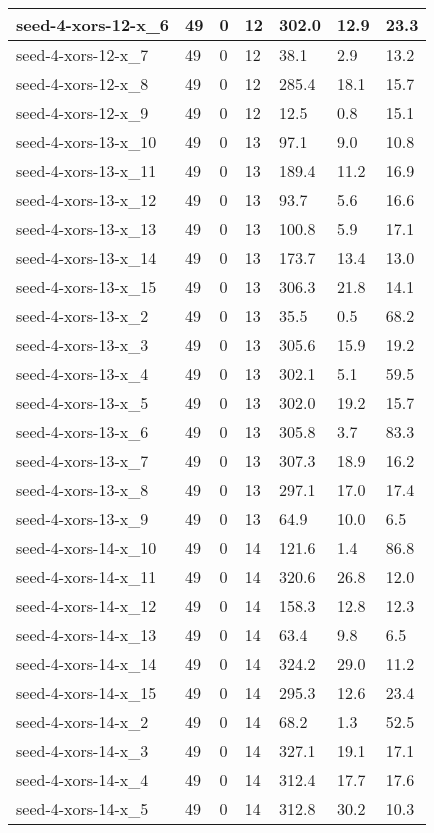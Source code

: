 \begin{scriptsize}
\begin{longtable}{|p{5cm}|l|l|l|l|l|l|}
seed-4-xors-12-x\_6&49&0&12&302.0&12.9&23.3 \\ \hline 
seed-4-xors-12-x\_7&49&0&12&38.1&2.9&13.2 \\ \hline 
seed-4-xors-12-x\_8&49&0&12&285.4&18.1&15.7 \\ \hline 
seed-4-xors-12-x\_9&49&0&12&12.5&0.8&15.1 \\ \hline 
seed-4-xors-13-x\_10&49&0&13&97.1&9.0&10.8 \\ \hline 
seed-4-xors-13-x\_11&49&0&13&189.4&11.2&16.9 \\ \hline 
seed-4-xors-13-x\_12&49&0&13&93.7&5.6&16.6 \\ \hline 
seed-4-xors-13-x\_13&49&0&13&100.8&5.9&17.1 \\ \hline 
seed-4-xors-13-x\_14&49&0&13&173.7&13.4&13.0 \\ \hline 
seed-4-xors-13-x\_15&49&0&13&306.3&21.8&14.1 \\ \hline 
seed-4-xors-13-x\_2&49&0&13&35.5&0.5&68.2 \\ \hline 
seed-4-xors-13-x\_3&49&0&13&305.6&15.9&19.2 \\ \hline 
seed-4-xors-13-x\_4&49&0&13&302.1&5.1&59.5 \\ \hline 
seed-4-xors-13-x\_5&49&0&13&302.0&19.2&15.7 \\ \hline 
seed-4-xors-13-x\_6&49&0&13&305.8&3.7&83.3 \\ \hline 
seed-4-xors-13-x\_7&49&0&13&307.3&18.9&16.2 \\ \hline 
seed-4-xors-13-x\_8&49&0&13&297.1&17.0&17.4 \\ \hline 
seed-4-xors-13-x\_9&49&0&13&64.9&10.0&6.5 \\ \hline 
seed-4-xors-14-x\_10&49&0&14&121.6&1.4&86.8 \\ \hline 
seed-4-xors-14-x\_11&49&0&14&320.6&26.8&12.0 \\ \hline 
seed-4-xors-14-x\_12&49&0&14&158.3&12.8&12.3 \\ \hline 
seed-4-xors-14-x\_13&49&0&14&63.4&9.8&6.5 \\ \hline 
seed-4-xors-14-x\_14&49&0&14&324.2&29.0&11.2 \\ \hline 
seed-4-xors-14-x\_15&49&0&14&295.3&12.6&23.4 \\ \hline 
seed-4-xors-14-x\_2&49&0&14&68.2&1.3&52.5 \\ \hline 
seed-4-xors-14-x\_3&49&0&14&327.1&19.1&17.1 \\ \hline 
seed-4-xors-14-x\_4&49&0&14&312.4&17.7&17.6 \\ \hline 
seed-4-xors-14-x\_5&49&0&14&312.8&30.2&10.3 \\ \hline 

\end{longtable}
\end{scriptsize}
